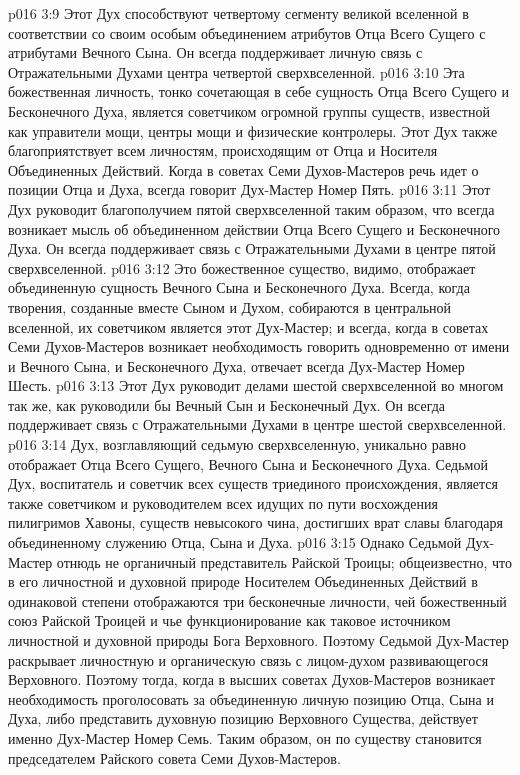 \vs p016 3:9 Этот Дух способствуют четвертому сегменту великой вселенной в соответствии со своим особым объединением атрибутов Отца Всего Сущего с атрибутами Вечного Сына. Он всегда поддерживает личную связь с Отражательными Духами центра четвертой сверхвселенной.
\vs p016 3:10 \pc {} Эта божественная личность, тонко сочетающая в себе сущность Отца Всего Сущего и Бесконечного Духа, является советчиком огромной группы существ, известной как управители мощи, центры мощи и физические контролеры. Этот Дух также благоприятствует всем личностям, происходящим от Отца и Носителя Объединенных Действий. Когда в советах Семи Духов\hyp{}Мастеров речь идет о позиции Отца и Духа, всегда говорит Дух\hyp{}Мастер Номер Пять.
\vs p016 3:11 Этот Дух руководит благополучием пятой сверхвселенной таким образом, что всегда возникает мысль об объединенном действии Отца Всего Сущего и Бесконечного Духа. Он всегда поддерживает связь с Отражательными Духами в центре пятой сверхвселенной.
\vs p016 3:12 \pc {} Это божественное существо, видимо, отображает объединенную сущность Вечного Сына и Бесконечного Духа. Всегда, когда творения, созданные вместе Сыном и Духом, собираются в центральной вселенной, их советчиком является этот Дух\hyp{}Мастер; и всегда, когда в советах Семи Духов\hyp{}Мастеров возникает необходимость говорить одновременно от имени и Вечного Сына, и Бесконечного Духа, отвечает всегда Дух\hyp{}Мастер Номер Шесть.
\vs p016 3:13 Этот Дух руководит делами шестой сверхвселенной во многом так же, как руководили бы Вечный Сын и Бесконечный Дух. Он всегда поддерживает связь с Отражательными Духами в центре шестой сверхвселенной.
\vs p016 3:14 \pc {} Дух, возглавляющий седьмую сверхвселенную, уникально равно отображает Отца Всего Сущего, Вечного Сына и Бесконечного Духа. Седьмой Дух, воспитатель и советчик всех существ триединого происхождения, является также советчиком и руководителем всех идущих по пути восхождения пилигримов Хавоны, существ невысокого чина, достигших врат славы благодаря объединенному служению Отца, Сына и Духа.
\vs p016 3:15 Однако Седьмой Дух\hyp{}Мастер отнюдь не органичный представитель Райской Троицы; общеизвестно, что в его личностной и духовной природе Носителем Объединенных Действий в одинаковой степени отображаются три бесконечные личности, чей божественный союз  Райской Троицей и чье функционирование как таковое  источником личностной и духовной природы Бога Верховного. Поэтому Седьмой Дух\hyp{}Мастер раскрывает личностную и органическую связь с лицом\hyp{}духом развивающегося Верховного. Поэтому тогда, когда в высших советах Духов\hyp{}Мастеров возникает необходимость проголосовать за объединенную личную позицию Отца, Сына и Духа, либо представить духовную позицию Верховного Существа, действует именно Дух\hyp{}Мастер Номер Семь. Таким образом, он по существу становится председателем Райского совета Семи Духов\hyp{}Мастеров.
